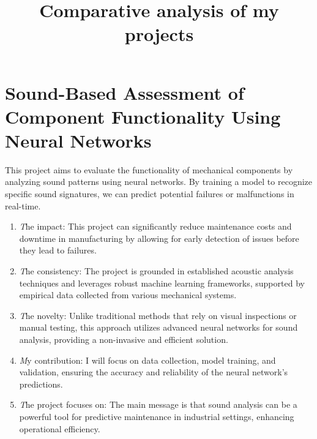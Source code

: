 \documentclass[12pt]{article}
\title{Comparative analysis of my projects}
\date{}
\begin{document}
\maketitle

\section{Sound-Based Assessment of Component Functionality Using Neural Networks}
This project aims to evaluate the functionality of mechanical components by analyzing sound patterns using neural networks. By training a model to recognize specific sound signatures, we can predict potential failures or malfunctions in real-time.
\begin{enumerate}
\item \emph The impact: This project can significantly reduce maintenance costs and downtime in manufacturing by allowing for early detection of issues before they lead to failures.
\item \emph The consistency: The project is grounded in established acoustic analysis techniques and leverages robust machine learning frameworks, supported by empirical data collected from various mechanical systems.
\item \emph The novelty: Unlike traditional methods that rely on visual inspections or manual testing, this approach utilizes advanced neural networks for sound analysis, providing a non-invasive and efficient solution.
\item \emph My contribution: I will focus on data collection, model training, and validation, ensuring the accuracy and reliability of the neural network's predictions.
\item \emph The project focuses on: The main message is that sound analysis can be a powerful tool for predictive maintenance in industrial settings, enhancing operational efficiency.
\end{enumerate}
\end{document}
